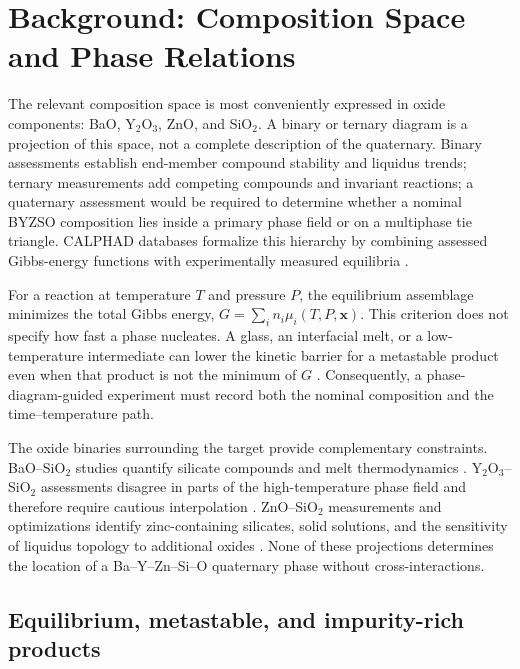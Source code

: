 \section{Background: Composition Space and Phase Relations}

The relevant composition space is most conveniently expressed in oxide components: BaO, Y$_2$O$_3$, ZnO, and SiO$_2$. A binary or ternary diagram is a projection of this space, not a complete description of the quaternary. Binary assessments establish end-member compound stability and liquidus trends; ternary measurements add competing compounds and invariant reactions; a quaternary assessment would be required to determine whether a nominal BYZSO composition lies inside a primary phase field or on a multiphase tie triangle. CALPHAD databases formalize this hierarchy by combining assessed Gibbs-energy functions with experimentally measured equilibria \cite{decterov2018thermodynamic,sundman2018a,hoch1996the,jantzen2019thermodynamic}.

For a reaction at temperature $T$ and pressure $P$, the equilibrium assemblage minimizes the total Gibbs energy, $G=\sum_i n_i\mu_i(T,P,\mathbf{x})$. This criterion does not specify how fast a phase nucleates. A glass, an interfacial melt, or a low-temperature intermediate can lower the kinetic barrier for a metastable product even when that product is not the minimum of $G$ \cite{schmelzer2020effects,mckenzie2020nucleation,bai2020kinetic}. Consequently, a phase-diagram-guided experiment must record both the nominal composition and the time--temperature path.

The oxide binaries surrounding the target provide complementary constraints. BaO--SiO$_2$ studies quantify silicate compounds and melt thermodynamics \cite{shukla2018thermodynamic,zhang2016thermodynamic,romeroserrano2010thermodynamic,tyurnina2008thermodynamic}. Y$_2$O$_3$--SiO$_2$ assessments disagree in parts of the high-temperature phase field and therefore require cautious interpolation \cite{makrovets2023y2o3,zhi2022thermodynamic,mao2008thermodynamic}. ZnO--SiO$_2$ measurements and optimizations identify zinc-containing silicates, solid solutions, and the sensitivity of liquidus topology to additional oxides \cite{shevchenko2019thermodynamic,jeon2025phase,abdeyazdan2024phase,dobrynenko2025solid}. None of these projections determines the location of a Ba--Y--Zn--Si--O quaternary phase without cross-interactions.

\subsection{Equilibrium, metastable, and impurity-rich products}

